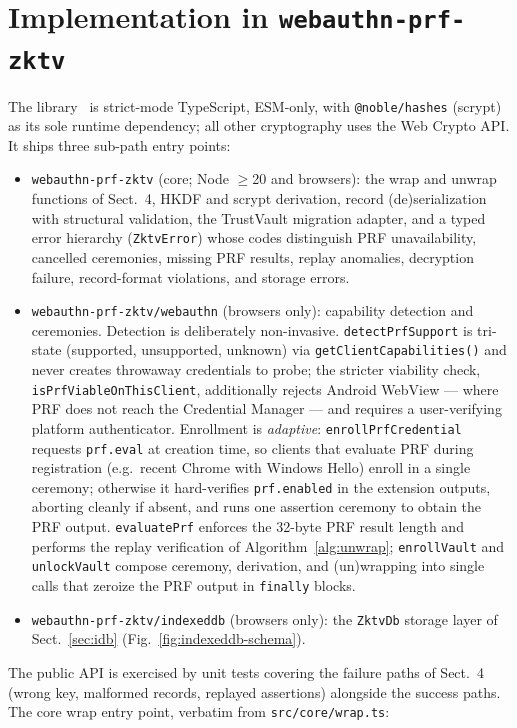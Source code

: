 \documentclass[runningheads]{llncs}
\begin{document}
\section{Implementation in \texttt{webauthn-prf-zktv}}
The library~\cite{zktv-lib} is strict-mode TypeScript, ESM-only, with \texttt{@noble/hashes} (scrypt) as its sole runtime dependency; all other cryptography uses the Web Crypto API.
It ships three sub-path entry points:
\begin{itemize}
  \item \texttt{webauthn-prf-zktv} (core; Node $\geq$20 and browsers): the wrap and unwrap functions of Sect.~4, HKDF and scrypt derivation, record (de)serialization with structural validation, the TrustVault migration adapter, and a typed error hierarchy (\texttt{ZktvError}) whose codes distinguish PRF unavailability, cancelled ceremonies, missing PRF results, replay anomalies, decryption failure, record-format violations, and storage errors.
  \item \texttt{webauthn-prf-zktv/webauthn} (browsers only): capability detection and ceremonies. Detection is deliberately non-invasive. \texttt{detectPrfSupport} is tri-state (supported, unsupported, unknown) via \texttt{getClientCapabilities()} and never creates throwaway credentials to probe; the stricter viability check, \texttt{isPrfViableOnThisClient}, additionally rejects Android WebView --- where PRF does not reach the Credential Manager --- and requires a user-verifying platform authenticator. Enrollment is \emph{adaptive}: \texttt{enrollPrfCredential} requests \texttt{prf.eval} at creation time, so clients that evaluate PRF during registration (e.g.\ recent Chrome with Windows Hello) enroll in a single ceremony; otherwise it hard-verifies \texttt{prf.enabled} in the extension outputs, aborting cleanly if absent, and runs one assertion ceremony to obtain the PRF output. \texttt{evaluatePrf} enforces the 32-byte PRF result length and performs the replay verification of Algorithm~\ref{alg:unwrap}; \texttt{enrollVault} and \texttt{unlockVault} compose ceremony, derivation, and (un)wrapping into single calls that zeroize the PRF output in \texttt{finally} blocks.
  \item \texttt{webauthn-prf-zktv/indexeddb} (browsers only): the \texttt{ZktvDb} storage layer of Sect.~\ref{sec:idb} (Fig.~\ref{fig:indexeddb-schema}).
\end{itemize}

The public API is exercised by unit tests covering the failure paths of Sect.~4 (wrong key, malformed records, replayed assertions) alongside the success paths.
The core wrap entry point, verbatim from \texttt{src/core/wrap.ts}:
\end{document}
